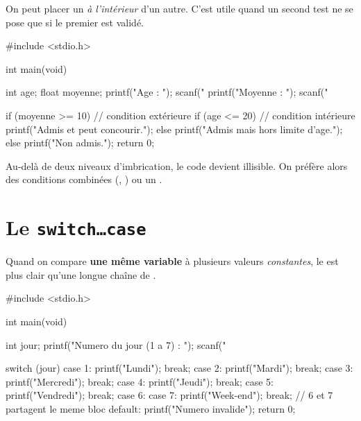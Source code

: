 On peut placer un  \emph{à l'intérieur} d'un autre. C'est utile quand un
second test ne se pose que si le premier est validé.

\begin{codec}
#include <stdio.h>

int main(void) {
    int age;
    float moyenne;
    printf("Age : ");      scanf("%
    printf("Moyenne : ");  scanf("%

    if (moyenne >= 10) {              // condition extérieure
        if (age <= 20) {             // condition intérieure
            printf("Admis et peut concourir.\n");
        } else {
            printf("Admis mais hors limite d'age.\n");
        }
    } else {
        printf("Non admis.\n");
    }
    return 0;
}
\end{codec}

\begin{attention}
Au-delà de deux niveaux d'imbrication, le code devient illisible. On préfère alors
des conditions combinées (\code{\&\&}, \code{||}) ou un .
\end{attention}

\section{Le \texttt{switch\dots case}}

Quand on compare \textbf{une même variable} à plusieurs valeurs \emph{constantes}, le
 est plus clair qu'une longue chaîne de .

\begin{syntaxe}
\end{syntaxe}

\begin{codec}
#include <stdio.h>

int main(void) {
    int jour;
    printf("Numero du jour (1 a 7) : ");
    scanf("%

    switch (jour) {
        case 1: printf("Lundi\n");    break;
        case 2: printf("Mardi\n");    break;
        case 3: printf("Mercredi\n"); break;
        case 4: printf("Jeudi\n");    break;
        case 5: printf("Vendredi\n"); break;
        case 6:
        case 7: printf("Week-end\n"); break;   // 6 et 7 partagent le meme bloc
        default: printf("Numero invalide\n");
    }
    return 0;
}
\end{codec}

